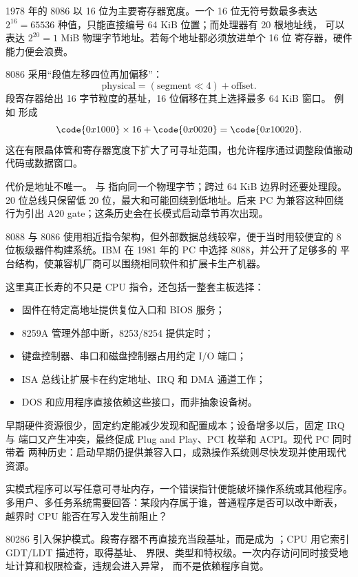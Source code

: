 1978 年的 8086 以 16 位为主要寄存器宽度。一个 16 位无符号数最多表达
\(2^{16}=65536\) 种值，只能直接编号 64 KiB 位置；而处理器有 20 根地址线，
可以表达 \(2^{20}=1\) MiB 物理字节地址。若每个地址都必须放进单个 16 位
寄存器，硬件能力便会浪费。

8086 采用“段值左移四位再加偏移”：
\[
\mathrm{physical}=(\mathrm{segment}\ll4)+\mathrm{offset}.
\]
段寄存器给出 16 字节粒度的基址，16 位偏移在其上选择最多 64 KiB 窗口。
例如  形成
\[
\code{0x1000}\times16+\code{0x0020}=\code{0x10020}.
\]
这在有限晶体管和寄存器宽度下扩大了可寻址范围，也允许程序通过调整段值搬动
代码或数据窗口。

代价是地址不唯一。 与
 指向同一个物理字节；跨过 64 KiB 边界时还要处理段。
20 位总线只保留低 20 位，最大和可能回绕到低地址。后来 PC 为兼容这种回绕
行为引出 A20 gate；这条历史会在长模式启动章节再次出现。

8088 与 8086 使用相近指令架构，但外部数据总线较窄，便于当时用较便宜的
8 位板级器件构建系统。IBM 在 1981 年的 PC 中选择 8088，并公开了足够多的
平台结构，使兼容机厂商可以围绕相同软件和扩展卡生产机器。

这里真正长寿的不只是 CPU 指令，还包括一整套主板选择：

\begin{itemize}[leftmargin=2em]
  \item 固件在特定高地址提供复位入口和 BIOS 服务；
  \item 8259A 管理外部中断，8253/8254 提供定时；
  \item 键盘控制器、串口和磁盘控制器占用约定 I/O 端口；
  \item ISA 总线让扩展卡在约定地址、IRQ 和 DMA 通道工作；
  \item DOS 和应用程序直接依赖这些接口，而非抽象设备树。
\end{itemize}

早期硬件资源很少，固定约定能减少发现和配置成本；设备增多以后，固定 IRQ 与
端口又产生冲突，最终促成 Plug and Play、PCI 枚举和 ACPI。现代 PC 同时带着
两种历史：启动早期仍提供兼容入口，成熟操作系统则尽快发现并使用现代资源。

实模式程序可以写任意可寻址内存，一个错误指针便能破坏操作系统或其他程序。
多用户、多任务系统需要回答：某段内存属于谁，普通程序是否可以改中断表，
越界时 CPU 能否在写入发生前阻止？

80286 引入保护模式。段寄存器不再直接充当段基址，而是成为
；CPU 用它索引 GDT/LDT 描述符，取得基址、
界限、类型和特权级。一次内存访问同时接受地址计算和权限检查，违规会进入异常，
而不是依赖程序自觉。

